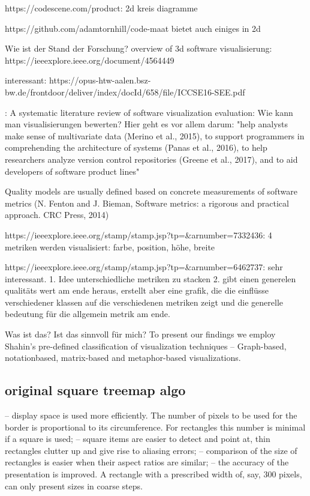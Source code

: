 https://codescene.com/product:
2d kreis diagramme

https://github.com/adamtornhill/code-maat
bietet auch einiges in 2d

Wie ist der Stand der Forschung?
overview of 3d software visualisierung: https://ieeexplore.ieee.org/document/4564449

interessant: https://opus-htw-aalen.bsz-bw.de/frontdoor/deliver/index/docId/658/file/ICCSE16-SEE.pdf

\cite{MERINO2018165}:
A systematic literature review of software visualization evaluation:
Wie kann man visualisierungen bewerten?
Hier geht es vor allem darum: "help analysts make sense of multivariate data
(Merino et al., 2015), to support programmers in comprehending the
architecture of systems (Panas et al., 2016), to help researchers analyze
version control repositories (Greene et al., 2017), and to aid developers
of software product lines"


Quality models are usually defined based on concrete measurements of software metrics (N. Fenton and J. Bieman, Software metrics: a rigorous and practical approach. CRC Press, 2014)

https://ieeexplore.ieee.org/stamp/stamp.jsp?tp=&arnumber=7332436:
4 metriken werden visualisiert: farbe, position, höhe, breite

https://ieeexplore.ieee.org/stamp/stamp.jsp?tp=&arnumber=6462737:
sehr interessant.
1. Idee unterschiedliche metriken zu stacken
2. gibt einen generelen qualitäts wert am ende heraus, erstellt aber eine grafik, die die einflüsse verschiedener klassen auf die verschiedenen metriken zeigt und die generelle bedeutung für die allgemein metrik am ende.


Was ist das? Ist das sinnvoll für mich?
To present our findings
we employ Shahin’s pre-defined classification of
visualization techniques – Graph-based, notationbased, matrix-based and metaphor-based
visualizations. 

\subsection{original square treemap algo}
– display space is used more efficiently. The number of pixels to be used for the border
is proportional to its circumference. For rectangles this number is minimal if a square
is used;
– square items are easier to detect and point at, thin rectangles clutter up and give rise
to aliasing errors;
– comparison of the size of rectangles is easier when their aspect ratios are similar;
– the accuracy of the presentation is improved. A rectangle with a prescribed width of,
say, 300 pixels, can only present sizes in coarse steps.


